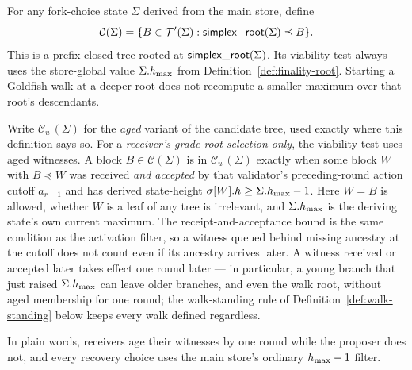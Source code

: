 \begin{definition}
\label{def:recovery-context}
For any fork-choice state \(\Sigma\) derived from the main store, define
\[
 \mathcal C(\Sigma)=
 \{B\in\mathcal{T}'(\Sigma):
       \mathsf{simplex\_root}(\Sigma)\preceq B\}.
\]
This is a prefix-closed tree rooted at \(\mathsf{simplex\_root}(\Sigma)\).  Its
viability test always uses the store-global value \(\Sigma.h_{\max}\) from
Definition~\ref{def:finality-root}.  Starting a Goldfish walk at a deeper
root does not recompute a smaller maximum over that root's descendants.

Write \(\mathcal C^{-}_u(\Sigma)\) for the \emph{aged} variant of the
candidate tree, used exactly where this definition says so.
For a \emph{receiver's grade-root selection only}, the viability test
uses aged witnesses.  A block \(B\in\mathcal C(\Sigma)\) is in
\(\mathcal C^{-}_u(\Sigma)\) exactly when some block \(W\) with
\(B\preceq W\) was received \emph{and accepted} by that validator's
preceding-round action cutoff \(a_{r-1}\) and has derived
state-height \(\sigma[W].h\geq\Sigma.h_{\max}-1\).  Here \(W=B\)
is allowed, whether \(W\) is a leaf of any tree is irrelevant, and
\(\Sigma.h_{\max}\) is the deriving state's own current maximum.  The
receipt-and-acceptance bound is the same condition as the activation
filter, so a witness queued behind missing ancestry at the cutoff does
not count even if its ancestry arrives later.  A witness received or
accepted later takes effect one round later --- in particular, a young
branch that just raised \(\Sigma.h_{\max}\) can leave older branches,
and even the walk root, without aged membership for one round; the
walk-standing rule of Definition~\ref{def:walk-standing} below keeps
every walk defined regardless.

In plain words, receivers age their witnesses by one round while the
proposer does not, and every recovery choice uses the main store's
ordinary \(h_{\max}-1\) filter.
\end{definition}

